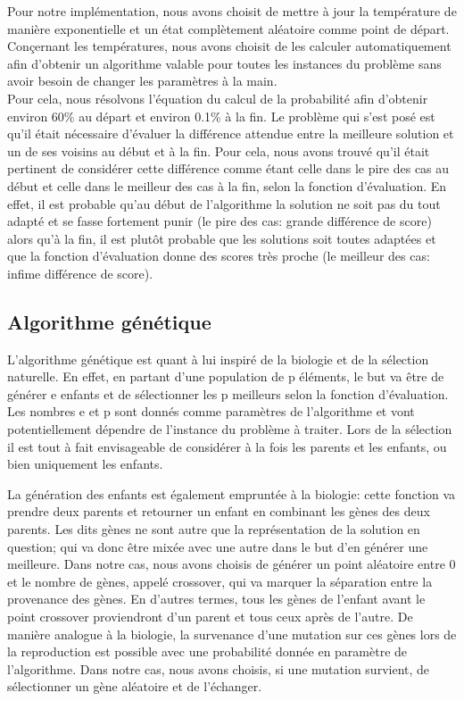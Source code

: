 \documentclass{article}
\begin{document}
Pour notre implémentation, nous avons choisit de mettre à jour la température de manière exponentielle et un état complètement aléatoire comme point de départ. Conçernant les températures, nous avons choisit de les calculer automatiquement afin d'obtenir un algorithme valable pour toutes les instances du problème sans avoir besoin de changer les paramètres à la main. \\
Pour cela, nous résolvons l'équation du calcul de la probabilité afin d'obtenir environ 60\% au départ et environ 0.1\% à la fin. Le problème qui s'est posé est qu'il était nécessaire d'évaluer la différence attendue entre la meilleure solution et un de ses voisins au début et à la fin. Pour cela, nous avons trouvé qu'il était pertinent de considérer cette différence comme étant celle dans le pire des cas au début et celle dans le meilleur des cas à la fin, selon la fonction d'évaluation. En effet, il est probable qu'au début de l'algorithme la solution ne soit pas du tout adapté et se fasse fortement punir (le pire des cas: grande différence de score) alors qu'à la fin, il est plutôt probable que les solutions soit toutes adaptées et que la fonction d'évaluation donne des scores très proche (le meilleur des cas: infime différence de score).

\subsection{Algorithme génétique}
L'algorithme génétique est quant à lui inspiré de la biologie et de la sélection naturelle. En effet, en partant d'une population de p éléments, le but va être de générer e enfants et de sélectionner les p meilleurs selon la fonction d'évaluation. Les nombres e et p sont donnés comme paramètres de l'algorithme et vont potentiellement dépendre de l'instance du problème à traiter. Lors de la sélection il est tout à fait envisageable de considérer à la fois les parents et les enfants, ou bien uniquement les enfants. \\ \par

La génération des enfants est également empruntée à la biologie: cette fonction va prendre deux parents et retourner un enfant en combinant les gènes des deux parents. Les dits gènes ne sont autre que la représentation de la solution en question; qui va donc être mixée avec une autre dans le but d'en générer une meilleure. Dans notre cas, nous avons choisis de générer un point aléatoire entre 0 et le nombre de gènes, appelé crossover, qui va marquer la séparation entre la provenance des gènes. En d'autres termes, tous les gènes de l'enfant avant le point crossover proviendront d'un parent et tous ceux après de l'autre. De manière analogue à la biologie, la survenance d'une mutation sur ces gènes lors de la reproduction est possible avec une probabilité donnée en paramètre de l'algorithme. Dans notre cas, nous avons choisis, si une mutation survient, de sélectionner un gène aléatoire et de l'échanger.
\end{document}
